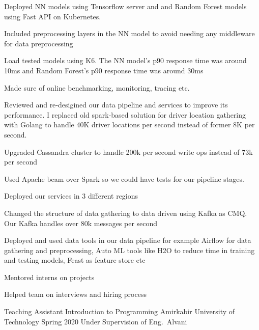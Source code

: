 \begin{cventries}
{\begin{cvitems}
        \item Deployed NN models using Tensorflow server and and Random Forest models using Fast API on Kubernetes. 
        \item Included preprocessing layers in the NN model to avoid needing any middleware for data preprocessing
        \item Load tested models using K6. The NN model's p90 response time was around 10ms and Random Forest's p90 response time was around 30ms
        \item Made sure of online benchmarking, monitoring, tracing etc.
        \item Reviewed and re‐desigined our data pipeline and services to improve its performance. I replaced old spark‐based solution for driver location gathering with Golang to handle 40K driver locations per second instead of former 8K per second.
        \item Upgraded Cassandra cluster to handle 200k per second write ops instead of 73k per second
        \item Used Apache beam over Spark so we could have tests for our pipeline stages.
        \item Deployed our services in 3 different regions 
        \item Changed the structure of data gathering to data driven using Kafka as CMQ. Our Kafka handles over 80k messages per second
        \item Deployed and used data tools in our data pipeline for example Airflow for data gathering and preprocessing, Auto ML tools like H2O to reduce time in training and testing models, Feast as feature store etc
        \item Mentored interns on projects 
        \item Helped team on interviews and hiring process
      \end{cvitems}
    }

\end{cventries}


\begin{cventries}

  \cventry
    {Teaching Assistant} %
    {Introduction to Programming} %
    {Amirkabir University of Technology} %
    {Spring 2020} %
    {Under Supervision of Eng.~Alvani}


\end{cventries}
